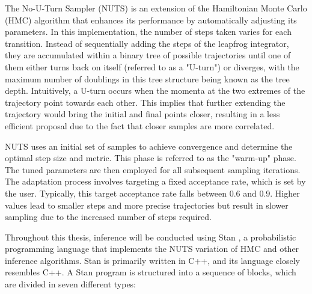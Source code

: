 The No-U-Turn Sampler (NUTS) is an extension of the Hamiltonian Monte Carlo (HMC) algorithm that enhances its
performance by automatically adjusting its parameters. In this implementation, the number of steps taken varies for each
transition. Instead of sequentially adding the steps of the leapfrog integrator, they are accumulated within a binary
tree of possible trajectories until one of them either turns back on itself (referred to as a "U-turn") or diverges,
with the maximum number of doublings in this tree structure being known as the tree depth. Intuitively, a U-turn occurs
when the momenta at the two extremes of the trajectory point towards each other. This implies that further extending the
trajectory would bring the initial and final points closer, resulting in a less efficient proposal due to the fact that
closer samples are more correlated.

NUTS uses an initial set of samples to achieve convergence and determine the optimal step size and metric. This phase is referred to as the "warm-up" phase. The tuned parameters are then employed for all subsequent sampling iterations. The adaptation process involves targeting a fixed acceptance rate, which is set by the user. Typically, this target acceptance rate falls between 0.6 and 0.9. Higher values lead to smaller steps and more precise trajectories but result in slower sampling due to the increased number of steps required.

Throughout this thesis, inference will be conducted using Stan \cite{carpenter2017stan}, a probabilistic programming language that implements the NUTS variation of HMC and other inference algorithms. Stan is primarily written in C++, and its language closely resembles C++. A Stan program is structured into a sequence of blocks, which are divided in seven different types:

